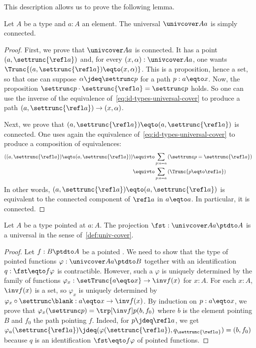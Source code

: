 This description allows us to prove the following lemma.
\begin{lemma}
  \label{lemma:universal-cover-simply-connected}%
  Let $A$ be a type and $a:A$ an element. The universal \covering
  $\univcover A a$ is simply connected.
\end{lemma}
\begin{proof}
  First, we prove that $\univcover A a$ is connected. It has a point
  $(a,\settrunc{\refl a})$ and, for every $(x,\alpha):\univcover A a$, one wants
  $\Trunc{(a,\settrunc{\refl a}) \eqto (x,\alpha)}$. This is a proposition, hence
  a set, so that one can suppose $\alpha \jdeq \settrunc p$ for a path
  $p:a\eqto x$. Now, the proposition
  $\settrunc p \cdot \settrunc {\refl a} = \settrunc p$ holds. So one can use
  the inverse of the equivalence of~\cref{eq:id-types-universal-cover} to
  produce a path $(a,\settrunc{\refl a}) \to (x,\alpha)$.

  Next, we prove that $(a,\settrunc{\refl a}) \eqto (a,\settrunc{\refl a})$ is
  connected. One uses again the equivalence
  of~\cref{eq:id-types-universal-cover} to produce a composition of
  equivalences:
  \begin{align*}
    \left((a,\settrunc{\refl a}) \eqto (a,\settrunc{\refl a})\right)
    &\equivto \sum_{p:a=a}\left( \settrunc p = \settrunc{\refl a} \right)
    \\
    &\equivto \sum_{p:a=a}\left( \Trunc {p \eqto \refl a} \right)
  \end{align*}
  In other words, $(a,\settrunc{\refl a}) \eqto (a,\settrunc{\refl a})$ is
  equivalent to the connected component of $\refl a$ in $a\eqto a$. In
  particular, it is connected.
\end{proof}

\begin{lemma}
  \label{lemma:universal-cover-is-universal}
  Let $A$ be a type pointed at $a:A$. The projection $\fst : \univcover A a \ptdto A$ is a universal \covering{} in the sense of~\cref{def:univ-cover}.
\end{lemma}
\begin{proof}
  Let $f : B \ptdto A$ be a pointed \covering{}. We need to show that the type of pointed functions $\varphi : \univcover A a \ptdto B$ together
  with an identification $q : \fst \eqto f \varphi$ is contractible. However, such a $\varphi$ is uniquely determined by the family of functions
  $\varphi_x : \setTrunc{ a \eqto x } \to \inv f (x)$ for $x : A$. For each $x : A$, $\inv f (x)$ is a set, so $\varphi_x$ is uniquely
  determined by $\varphi_x \circ \settrunc\blank : a \eqto x \to \inv f (x)$. By induction on $p : a \eqto x$, we prove that
  $\varphi_x (\settrunc p) = \trp [\inv f] p (b , f_0) $ where $b$ is the element pointing $B$ and $f_0$ the path pointing $f$. Indeed, for
  $p \jdeq \refl a$, we get $\varphi_a (\settrunc {\refl a}) \jdeq (\varphi (\settrunc {\refl a}) , q_{\settrunc {\refl a}}) = (b , f_0)$
  because $q$ is an identification $\fst \eqto f \varphi$ of pointed functions.
\end{proof}


